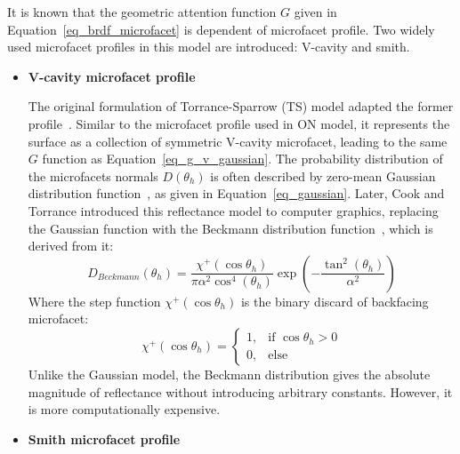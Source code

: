 It is known that the geometric attention function $G$ given in Equation~\eqref{eq_brdf_microfacet} is dependent of microfacet profile.
Two widely used microfacet profiles in this model are introduced: V-cavity and smith.

\begin{itemize}
    \item \textbf{V-cavity microfacet profile}

          The original formulation of Torrance-Sparrow (TS) model adapted the former profile~\cite{1967_Torrance,2000_Meister}.
          Similar to the microfacet profile used in ON model, it represents the surface as a collection of symmetric V-cavity microfacet, leading to the same $G$ function as Equation~\eqref{eq_g_v_gaussian}.
          The probability distribution of the microfacets normals $D(\theta_h)$ is often described by zero-mean Gaussian distribution function~\cite{2000_Meister,2010_Roser}, as given in Equation~\eqref{eq_gaussian}.
          Later, Cook and Torrance introduced this reflectance model to computer graphics, replacing the Gaussian function with the Beckmann distribution function~\cite{1982_Cook, 2014_Heitz}, which is derived from it:
          \begin{equation}
              \label{eq_Beckmann}
              D_{Beckmann}(\theta_h) = \frac{\chi^{+}(\cos\theta_h)}{\pi \alpha^2 \cos^4(\theta_h)}\exp\left(-\frac{\tan^2(\theta_h)}{\alpha^2}\right)
          \end{equation}
          Where the step function $\chi^{+}(\cos\theta_h)$ is the binary discard of backfacing microfacet:
          \begin{equation}
              \label{eq_step_func}
              \chi^{+}(\cos\theta_h) = \begin{cases}
                  1, & \mbox{if $\cos\theta_h > 0$} \\
                  0, & \mbox{else}
              \end{cases}
          \end{equation}
          Unlike the Gaussian model, the Beckmann distribution gives the absolute magnitude of reflectance without introducing arbitrary constants.
          However, it is more computationally expensive.


    \item \textbf{Smith microfacet profile}


\end{itemize}
